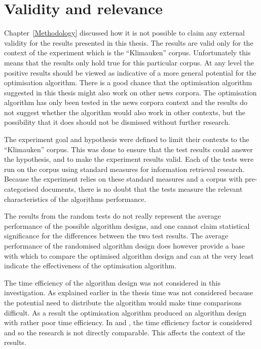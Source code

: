 
\section{Validity and relevance}
\label{ValidityRelevance}
Chapter~\ref{Methodology} discussed how it is not possible to claim any external validity for the results presented in this thesis. The results are valid only for the context of the experiment which is the ``Klimauken'' corpus. Unfortunately this means that the results only hold true for this particular corpus. At any level the positive results should be viewed as indicative of a more general potential for the optimisation algorithm. There is a good chance that the optimisation algorithm suggested in this thesis might also work on other news corpora. The optimisation algorithm has only been tested in the news corpora context and the results do not suggest whether the algorithm would also work in other contexts, but the possibility that it does should not be dismissed without further research.

The experiment goal and hypothesis were defined to limit their contexts to the ``Klimauken'' corpus. This was done to ensure that the test results could answer the hypothesis, and to make the experiment results valid. Each of the tests were run on the corpus using standard measures for information retrieval research. Because the experiment relies on these standard measures and a corpus with pre-categorised documents, there is no doubt that the tests measure the relevant characteristics of the \CTC algorithms performance.

The results from the random tests do not really represent the average performance of the possible algorithm designs, and one cannot claim statistical significance for the differences between the two test results. The average performance of the randomised algorithm design does however provide a base with which to compare the optimised algorithm design and can at the very least indicate the effectiveness of the optimisation algorithm.

The time efficiency of the algorithm design was not considered in this investigation. As explained earlier in the thesis time was not considered because the potential need to distribute the algorithm would make time comparisons difficult. As a result the optimisation algorithm produced an algorithm design with rather poor time efficiency. In \cite{Moe2014} and \cite{Moe2014compact}, the time efficiency factor is considered and so the research is not directly comparable. This affects the context of the results.

